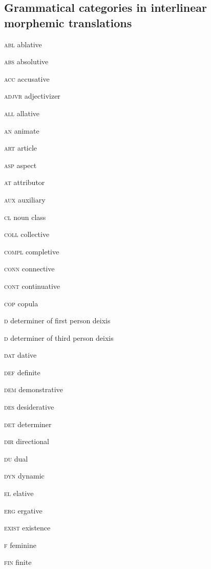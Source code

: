 \begin{refsection}

\section*{Grammatical categories in interlinear morphemic translations}

\begin{multicols}{2}
\setlength{\parindent}{0pt}\textsc{abl}  ablative
	
	\textsc{abs}  absolutive
	
	\textsc{acc}  accusative
	
	\textsc{adjvr}  adjectivizer
	
	\textsc{all}  allative
	
	\textsc{an}  animate
	
	\textsc{art}  article
	
	\textsc{asp}  aspect
	
	\textsc{at}  attributor
	
	\textsc{aux}  auxiliary
	
	\textsc{cl}  noun class
	
	\textsc{coll}  collective
	
	\textsc{compl}  completive
	
	\textsc{conn}  connective
	
	\textsc{cont}  continuative
	
	\textsc{cop}  copula
	
	\textsc{d}  determiner of first person deixis
	
	\textsc{d}  determiner of third person deixis
	
	\textsc{dat}  dative
	
	\textsc{def}  definite
	
	\textsc{dem}  demonstrative
	
	\textsc{des}  desiderative
	
	\textsc{det}  determiner
	
	\textsc{dir}  directional
	
	\textsc{du}  dual
	
	\textsc{dyn}  dynamic
	
	\textsc{el}  elative
	
	\textsc{erg}  ergative
	
	\textsc{exist}  existence
	
	\textsc{f}  feminine
	
	\textsc{fin}  finite
	

\end{multicols}
\end{refsection}
